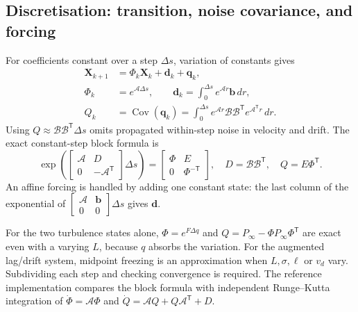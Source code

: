 \documentclass[11pt,a4paper]{article}
\numberwithin{equation}{section}
\begin{document}
\subsection{Discretisation: transition, noise covariance, and forcing}
For coefficients constant over a step $\Delta s$, variation of constants gives
\begin{align}
 \mathbf X_{k+1}&=\Phi_k\mathbf X_k+\mathbf d_k+\mathbf q_k,\\
 \Phi_k&=e^{\mathcal A\Delta s},\qquad
 \mathbf d_k=\int_0^{\Delta s}e^{\mathcal A r}\mathbf b\,dr,\\
 Q_k&=\operatorname{Cov}(\mathbf q_k)
 =\int_0^{\Delta s}e^{\mathcal A r}\mathcal B\mathcal B^{\mathsf T}e^{\mathcal A^{\mathsf T}r}\,dr.
\end{align}
Using $Q\approx\mathcal B\mathcal B^{\mathsf T}\Delta s$ omits propagated within-step noise in velocity and drift. The exact constant-step block formula is
\begin{equation}
 \exp\!\left(\begin{bmatrix}\mathcal A&D\\0&-\mathcal A^{\mathsf T}\end{bmatrix}\Delta s\right)
 =\begin{bmatrix}\Phi&E\\0&\Phi^{-\mathsf T}\end{bmatrix},
 \quad D=\mathcal B\mathcal B^{\mathsf T},\quad Q=E\Phi^{\mathsf T}.
\end{equation}
An affine forcing is handled by adding one constant state: the last column of the exponential of $\left[\begin{smallmatrix}\mathcal A&\mathbf b\\0&0\end{smallmatrix}\right]\Delta s$ gives $\mathbf d$.

For the two turbulence states alone, $\Phi=e^{F\Delta q}$ and $Q=P_\infty-\Phi P_\infty\Phi^{\mathsf T}$ are exact even with a varying $L$, because $q$ absorbs the variation. For the augmented lag/drift system, midpoint freezing is an approximation when $L,\sigma,\ell$ or $v_d$ vary. Subdividing each step and checking convergence is required. The reference implementation compares the block formula with independent Runge--Kutta integration of $\dot\Phi=\mathcal A\Phi$ and $\dot Q=\mathcal A Q+Q\mathcal A^{\mathsf T}+D$.
\end{document}
